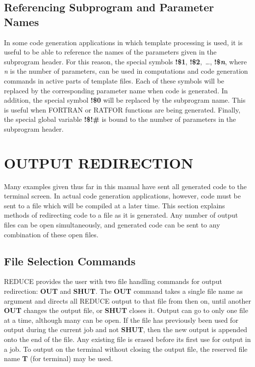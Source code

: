 \section{Referencing Subprogram and Parameter Names}
In some code generation applications in which template processing is used,
it is useful to be able to reference the names of the parameters
given in the subprogram header.  For this reason, the special
symbols {\bf !\$1}, {\bf !\$2},~\dots, {\bf !\${\it n}}, where {\it n}
is the number
of parameters, can be used in computations and code generation commands in
active parts of template files.  Each of these symbols will be replaced by
the corresponding parameter name when code is generated.  In addition, the
special symbol {\bf !\$0} will be replaced by the subprogram name.  This is
useful when FORTRAN or RATFOR functions are being generated.  Finally, the
special global variable {\bf !\$!\#} is bound to the number of parameters in
the subprogram header.

\chapter{OUTPUT REDIRECTION}
Many examples given thus far in this manual have sent all generated code to
the terminal screen.  In actual code generation applications, however,
code must be sent to a file which will be compiled at a later
time.  This section explains methods of redirecting code to a
file as it is generated.  Any number of output files can be open
simultaneously, and generated code can be sent to any combination
of these open files.

\section{File Selection Commands}
\label{file:selection}
REDUCE provides the user with two file handling commands for
output redirection:  {\bf OUT} and {\bf SHUT}.  The {\bf OUT} command takes
a single file name as argument and directs all REDUCE output to that file
from then on, until another {\bf OUT} changes the output file, or {\bf SHUT}
closes it.  Output can go to only one file at a time,
although many can be open.  If the file has previously been
used for output during the current job and not {\bf SHUT}, then the
new output is appended onto the end of the file.  Any existing file
is erased before its first use for output in a job.  To output
on the terminal without closing the output file, the reserved file name
{\bf T} (for terminal) may be used.

